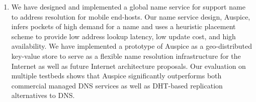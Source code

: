 \begin{enumerate}
\item
We have designed and implemented a global name service for support name to address resolution for mobile end-hosts. Our name service design, Auspice, infers pockets of high demand for a name and uses a heuristic placement scheme to provide low address lookup latency, low update cost, and high availability.
We have implemented a prototype of Auspice as a geo-distributed key-value store to serve as a flexible name resolution infrastructure for the Internet as well as future Internet architecture proposals.
Our evaluation on multiple testbeds shows that Auspice significantly outperforms both commercial managed DNS services as well as DHT-based replication alternatives to DNS.
\end{enumerate}


 
